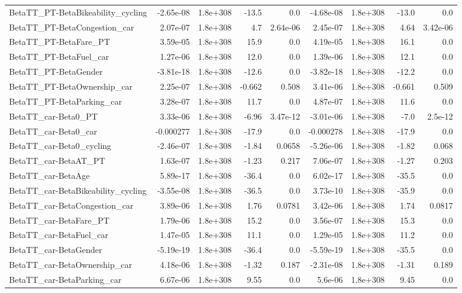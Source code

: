 \begin{tabular}{lrrrrrrrr}
BetaTT_PT-BetaBikeability_cycling & -2.65e-08 & 1.8e+308 & -13.5 & 0.0 & -4.68e-08 & 1.8e+308 & -13.0 & 0.0 \\
BetaTT_PT-BetaCongestion_car & 2.07e-07 & 1.8e+308 & 4.7 & 2.64e-06 & 2.45e-07 & 1.8e+308 & 4.64 & 3.42e-06 \\
BetaTT_PT-BetaFare_PT & 3.59e-05 & 1.8e+308 & 15.9 & 0.0 & 4.19e-05 & 1.8e+308 & 16.1 & 0.0 \\
BetaTT_PT-BetaFuel_car & 1.27e-06 & 1.8e+308 & 12.0 & 0.0 & 1.39e-06 & 1.8e+308 & 12.1 & 0.0 \\
BetaTT_PT-BetaGender & -3.81e-18 & 1.8e+308 & -12.6 & 0.0 & -3.82e-18 & 1.8e+308 & -12.2 & 0.0 \\
BetaTT_PT-BetaOwnership_car & 2.25e-07 & 1.8e+308 & -0.662 & 0.508 & 3.41e-06 & 1.8e+308 & -0.661 & 0.509 \\
BetaTT_PT-BetaParking_car & 3.28e-07 & 1.8e+308 & 11.7 & 0.0 & 4.87e-07 & 1.8e+308 & 11.6 & 0.0 \\
BetaTT_car-Beta0_PT & 3.33e-06 & 1.8e+308 & -6.96 & 3.47e-12 & -3.01e-06 & 1.8e+308 & -7.0 & 2.5e-12 \\
BetaTT_car-Beta0_car & -0.000277 & 1.8e+308 & -17.9 & 0.0 & -0.000278 & 1.8e+308 & -17.9 & 0.0 \\
BetaTT_car-Beta0_cycling & -2.46e-07 & 1.8e+308 & -1.84 & 0.0658 & -5.26e-06 & 1.8e+308 & -1.82 & 0.068 \\
BetaTT_car-BetaAT_PT & 1.63e-07 & 1.8e+308 & -1.23 & 0.217 & 7.06e-07 & 1.8e+308 & -1.27 & 0.203 \\
BetaTT_car-BetaAge & 5.89e-17 & 1.8e+308 & -36.4 & 0.0 & 6.02e-17 & 1.8e+308 & -35.5 & 0.0 \\
BetaTT_car-BetaBikeability_cycling & -3.55e-08 & 1.8e+308 & -36.5 & 0.0 & 3.73e-10 & 1.8e+308 & -35.9 & 0.0 \\
BetaTT_car-BetaCongestion_car & 3.89e-06 & 1.8e+308 & 1.76 & 0.0781 & 3.42e-06 & 1.8e+308 & 1.74 & 0.0817 \\
BetaTT_car-BetaFare_PT & 1.79e-06 & 1.8e+308 & 15.2 & 0.0 & 3.56e-07 & 1.8e+308 & 15.3 & 0.0 \\
BetaTT_car-BetaFuel_car & 1.47e-05 & 1.8e+308 & 11.1 & 0.0 & 1.29e-05 & 1.8e+308 & 11.2 & 0.0 \\
BetaTT_car-BetaGender & -5.19e-19 & 1.8e+308 & -36.4 & 0.0 & -5.59e-19 & 1.8e+308 & -35.5 & 0.0 \\
BetaTT_car-BetaOwnership_car & 4.18e-06 & 1.8e+308 & -1.32 & 0.187 & -2.31e-08 & 1.8e+308 & -1.31 & 0.189 \\
BetaTT_car-BetaParking_car & 6.67e-06 & 1.8e+308 & 9.55 & 0.0 & 5.6e-06 & 1.8e+308 & 9.45 & 0.0 \\

\end{tabular}
